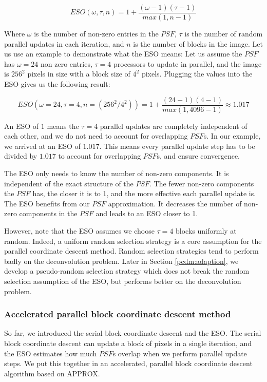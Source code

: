 \begin{equation}\label{pcdm:pcdm:eso}
ESO(\omega, \tau, n) = 1+ \frac{(\omega - 1)(\tau - 1)}{max(1, n -1)}
\end{equation}

Where $\omega$ is the number of non-zero entries in the $PSF$, $\tau$ is the number of random parallel updates in each iteration, and $n$ is the number of blocks in the image. Let us use an example to demonstrate what the ESO means: Let us assume the $PSF$ has $\omega = 24$ non zero entries, $\tau = 4$ processors to update in parallel, and the image is $256^2$ pixels in size with a block size of $4^2$ pixels. Plugging the values into the ESO gives us the following result:

\begin{equation}
ESO(\omega = 24, \tau = 4, n = (256^2 / 4^2)) = 1+ \frac{(24 - 1)(4 - 1)}{max(1, 4096 -1)} \approx 1.017
\end{equation}

An ESO of $1$ means the $\tau = 4$ parallel updates are completely independent of each other, and we do not need to account for overlapping $PSF$s. In our example, we arrived at an ESO of $1.017$. This means every parallel update step has to be divided by $1.017$ to account for overlapping $PSF$s, and ensure convergence.

The ESO only needs to know the number of non-zero components. It is independent of the exact structure of the $PSF$. The fewer non-zero components the $PSF$ has, the closer it is to 1, and the more effective each parallel update is. The ESO benefits from our $PSF$ approximation. It decreases the number of non-zero components in the $PSF$ and leads to an ESO closer to 1.

However, note that the ESO assumes we choose $\tau = 4$ blocks uniformly at random. Indeed, a uniform random selection strategy is a core assumption for the parallel coordinate descent method\cite{richtarik2016parallel}. Random selection strategies tend to perform badly on the deconvolution problem. Later in Section \ref{pcdm:adaption}, we develop a pseudo-random selection strategy which does not break the random selection assumption of the ESO, but performs better on the deconvolution problem.


\subsubsection{Accelerated parallel block coordinate descent method}
So far, we introduced the serial block coordinate descent and the ESO. The serial block coordinate descent can update a block of pixels in a single iteration, and the ESO estimates how much $PSF$s overlap when we perform parallel update steps. We put this together in an accelerated, parallel block coordinate descent algorithm based on APPROX\cite{fercoq2015accelerated}.



